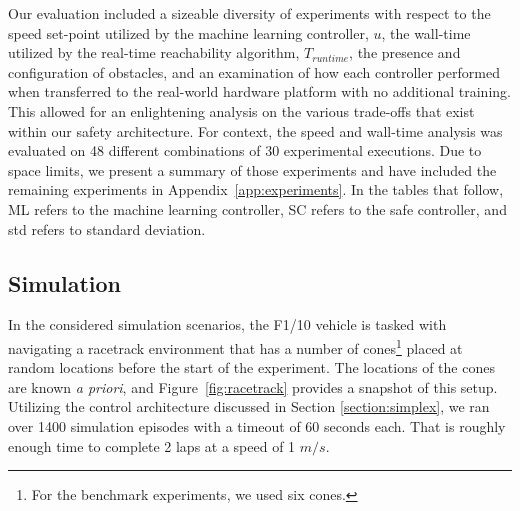 \documentclass[manuscript,screen,review]{acmart}
\begin{document}
Our evaluation included a sizeable diversity of experiments with respect to the speed set-point utilized by the machine learning controller, $u$, the wall-time utilized by the real-time reachability algorithm, $T_{runtime}$, the presence and configuration of obstacles, and an examination of how each controller performed when transferred to the real-world hardware platform with no additional training. This allowed for an enlightening analysis on the various trade-offs that exist within our safety architecture. For context, the speed and wall-time analysis was evaluated on 48 different combinations of 30 experimental executions. Due to space limits, we present a summary of those experiments and have included the remaining experiments in Appendix~\ref{app:experiments}. In the tables that follow, ML refers to the machine learning controller, SC refers to the safe controller, and std refers to standard deviation. %

\subsection{Simulation}

In the considered simulation scenarios, the F1/10 vehicle is tasked with navigating a racetrack environment that has a number of cones\footnote{For the benchmark experiments, we used six cones.} placed at random locations before the start of the experiment. The locations of the cones are known \emph{a priori}, and Figure~\ref{fig:racetrack} provides a snapshot of this setup. Utilizing the control architecture discussed in Section \ref{section:simplex}, we ran over 1400 simulation episodes with a timeout of 60 seconds each. That is roughly enough time to complete 2 laps at a speed of 1 $m/s$. %
\end{document}
